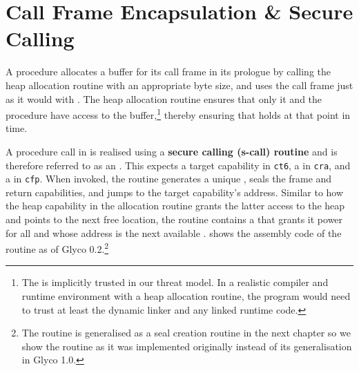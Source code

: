 \documentclass[main.tex]{subfiles}
\begin{document}
\section{Call Frame Encapsulation \& Secure Calling} \label{sct:ghscc}
A procedure allocates a buffer for its call frame in its prologue by calling the heap allocation routine with an appropriate byte size, and uses the call frame just as it would with . The heap allocation routine ensures that only it and the procedure have access to the buffer,\footnote{The  is implicitly trusted in our threat model. In a realistic compiler and runtime environment with a heap allocation routine, the program would need to trust at least the dynamic linker and any linked runtime code.} thereby ensuring that  holds at that point in time.

A procedure call in  is realised using a \textbf{secure calling (s-call) routine} and is therefore referred to as an \textbf{}. This  expects a target capability in \texttt{ct6}, a  in \texttt{cra}, and a  in \texttt{cfp}. When invoked, the routine generates a unique , seals the frame and return capabilities, and jumps to the target capability's address. Similar to how the heap capability in the allocation routine grants the latter access to the heap and points to the next free location, the  routine contains a  that grants it  power for all  and whose address is the next available .  shows the assembly code of the  routine as of Glyco 0.2.\footnote{The  routine is generalised as a seal creation routine in the next chapter so we show the  routine as it was implemented originally instead of its generalisation in Glyco 1.0.}
\begin{listing}
	\caption{Assembly code of the  routine as inserted in each program compiled by Glyco 0.2. The CHERI LLVM assembler did not support the \iasm/cclear/ instruction at the time of development so it's encoded directly by Glyco instead. The next free  is stored at \texttt{mm.seal_cap} and is initialised by the initialisation routine (which is part of the ).}
	\label{lst:scall}
\end{listing}
\end{document}
